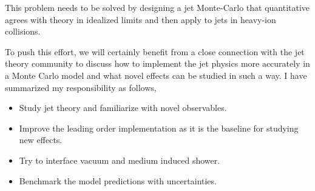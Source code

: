 \documentclass[10pt,a4paper]{article}
\begin{document}
This problem needs to be solved by designing a jet Monte-Carlo that quantitative agrees with theory in idealized limits and then apply to jets in heavy-ion collisions.

To push this effort, we will certainly benefit from a close connection with the jet theory community to discuss how to implement the jet physics more accurately in a Monte Carlo model and what novel effects can be studied in such a way. I have summarized my responsibility as follows,
\begin{itemize}
\item Study jet theory and familiarize with novel observables.
\item Improve the leading order implementation as it is  the baseline for studying new effects.
\item Try to interface vacuum and medium induced shower.
\item Benchmark the model predictions with uncertainties.
\end{itemize}



\end{document}

